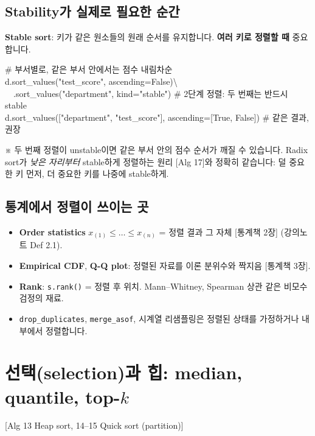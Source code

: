 \documentclass[11pt,a4paper]{article}
\newcommand{\term}[1]{\textbf{#1}}
\newcommand{\code}[1]{\texttt{#1}}
\newcommand{\aref}[1]{{\footnotesize\textsf{\color{blue!55!black}[Alg #1]}}}
\newcommand{\sref}[1]{{\footnotesize\textsf{\color{green!40!black}[통계책 #1]}}}
\newcommand{\aside}[1]{{\footnotesize\color{black!65}#1}}
\begin{document}
\subsection{Stability가 실제로 필요한 순간}
\term{Stable sort}: 키가 같은 원소들의 원래 순서를 유지합니다. \textbf{여러 키로 정렬할 때} 중요합니다.
\begin{codebox}
\# 부서별로, 같은 부서 안에서는 점수 내림차순\\
d.sort\_values("test\_score", ascending=False)\textbackslash\\
\ \ .sort\_values("department", kind="stable") \hfill \# 2단계 정렬: 두 번째는 반드시 stable\\
d.sort\_values(["department", "test\_score"], ascending=[True, False]) \hfill \# 같은 결과, 권장
\end{codebox}
\aside{※ 두 번째 정렬이 unstable이면 같은 부서 안의 점수 순서가 깨질 수 있습니다. Radix sort가 \emph{낮은 자리부터} stable하게 정렬하는 원리 \aref{17}와 정확히 같습니다: 덜 중요한 키 먼저, 더 중요한 키를 나중에 stable하게.}

\subsection{통계에서 정렬이 쓰이는 곳}
\begin{itemize}
\item \term{Order statistics} $x_{(1)}\le\dots\le x_{(n)}$ = 정렬 결과 그 자체 \sref{2장} (강의노트 Def 2.1).
\item \term{Empirical CDF}, \term{Q-Q plot}: 정렬된 자료를 이론 분위수와 짝지음 \sref{3장}.
\item \term{Rank}: \code{s.rank()} = 정렬 후 위치. Mann–Whitney, Spearman 상관 같은 비모수 검정의 재료.
\item \code{drop\_duplicates}, \code{merge\_asof}, 시계열 리샘플링은 정렬된 상태를 가정하거나 내부에서 정렬합니다.
\end{itemize}

\section{선택(selection)과 힙: median, quantile, top-$k$}
\aref{13 Heap sort, 14–15 Quick sort (partition)}
\end{document}
